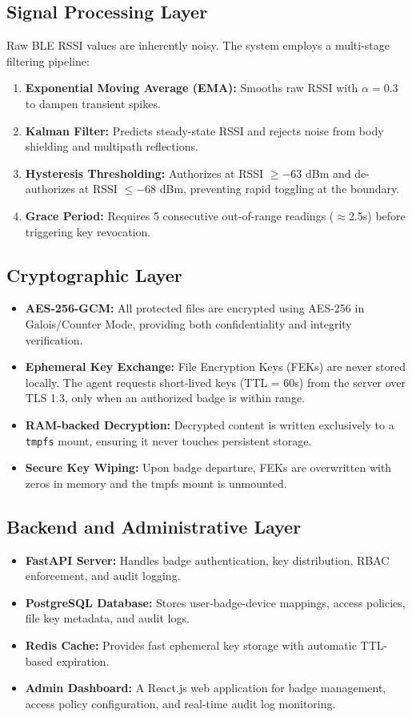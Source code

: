 \documentclass[conference]{IEEEtran}
\begin{document}
\subsection{Signal Processing Layer}
Raw BLE RSSI values are inherently noisy. The system employs a multi-stage filtering pipeline:
\begin{enumerate}[noitemsep]
    \item \textbf{Exponential Moving Average (EMA):} Smooths raw RSSI with $\alpha = 0.3$ to dampen transient spikes.
    \item \textbf{Kalman Filter:} Predicts steady-state RSSI and rejects noise from body shielding and multipath reflections.
    \item \textbf{Hysteresis Thresholding:} Authorizes at RSSI $\geq -63$ dBm and de-authorizes at RSSI $\leq -68$ dBm, preventing rapid toggling at the boundary.
    \item \textbf{Grace Period:} Requires 5 consecutive out-of-range readings ($\approx$2.5s) before triggering key revocation.
\end{enumerate}

\subsection{Cryptographic Layer}
\begin{itemize}[noitemsep]
    \item \textbf{AES-256-GCM:} All protected files are encrypted using AES-256 in Galois/Counter Mode, providing both confidentiality and integrity verification.
    \item \textbf{Ephemeral Key Exchange:} File Encryption Keys (FEKs) are never stored locally. The agent requests short-lived keys (TTL = 60s) from the server over TLS 1.3, only when an authorized badge is within range.
    \item \textbf{RAM-backed Decryption:} Decrypted content is written exclusively to a \texttt{tmpfs} mount, ensuring it never touches persistent storage.
    \item \textbf{Secure Key Wiping:} Upon badge departure, FEKs are overwritten with zeros in memory and the tmpfs mount is unmounted.
\end{itemize}

\subsection{Backend and Administrative Layer}
\begin{itemize}[noitemsep]
    \item \textbf{FastAPI Server:} Handles badge authentication, key distribution, RBAC enforcement, and audit logging.
    \item \textbf{PostgreSQL Database:} Stores user-badge-device mappings, access policies, file key metadata, and audit logs.
    \item \textbf{Redis Cache:} Provides fast ephemeral key storage with automatic TTL-based expiration.
    \item \textbf{Admin Dashboard:} A React.js web application for badge management, access policy configuration, and real-time audit log monitoring.
\end{itemize}
\end{document}

